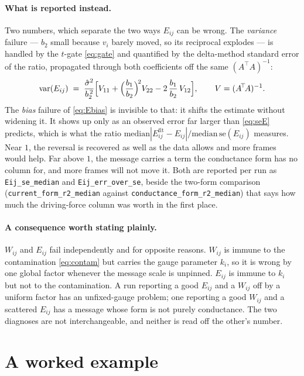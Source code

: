\documentclass[11pt,a4paper]{article}
\newcommand{\vi}{v_i}
\newcommand{\Wij}{W_{ij}}
\newcommand{\Eij}{E_{ij}}
\begin{document}
\paragraph{What is reported instead.} Two numbers, which separate the two ways
$\Eij$ can be wrong. The \emph{variance} failure --- $b_2$ small because $\vi$
barely moved, so its reciprocal explodes --- is handled by the $t$-gate
\eqref{eq:gate} and quantified by the delta-method standard error of the ratio,
propagated through both coefficients off the same $(A^{\!\top}\!A)^{-1}$:
%
\begin{equation}
\mathrm{var}(\Eij) \;=\; \frac{\hat\sigma^2}{b_2^{\,2}}
  \Bigl[ V_{11} + \Bigl(\frac{b_1}{b_2}\Bigr)^{\!2} V_{22}
         - 2\,\frac{b_1}{b_2}\,V_{12} \Bigr],
\qquad V = (A^{\!\top}\!A)^{-1} .
\label{eq:seE}
\end{equation}
%
The \emph{bias} failure of \eqref{eq:Ebias} is invisible to that: it shifts the
estimate without widening it. It shows up only as an observed error far larger
than \eqref{eq:seE} predicts, which is what the ratio
$\mathrm{median}|\Eij^{\mathrm{fit}} - \Eij| \big/ \mathrm{median}\,
\mathrm{se}(\Eij)$ measures. Near $1$, the reversal is recovered as well as the
data allows and more frames would help. Far above $1$, the message carries a
term the conductance form has no column for, and more frames will not move it.
Both are reported per run as \texttt{Eij\_se\_median} and
\texttt{Eij\_err\_over\_se}, beside the two-form comparison
(\texttt{current\_form\_r2\_median} against
\texttt{conductance\_form\_r2\_median}) that says how much the driving-force
column was worth in the first place.

\paragraph{A consequence worth stating plainly.} $\Wij$ and $\Eij$ fail
independently and for opposite reasons. $\Wij$ is immune to the contamination
\eqref{eq:contam} but carries the gauge parameter $k_i$, so it is wrong by one
global factor whenever the message scale is unpinned. $\Eij$ is immune to $k_i$
but not to the contamination. A run reporting a good $\Eij$ and a $\Wij$ off by a
uniform factor has an unfixed-gauge problem; one reporting a good $\Wij$ and a
scattered
$\Eij$ has a message whose form is not purely conductance. The two diagnoses are
not interchangeable, and neither is read off the other's number.

\section{A worked example}
\end{document}
